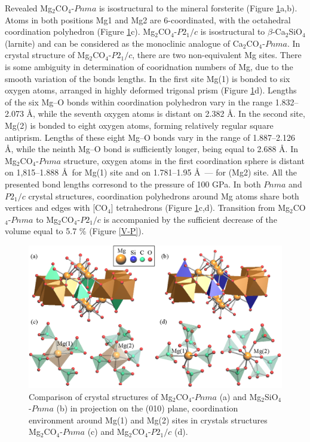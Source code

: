 \documentclass[a4paperm]{article}
\begin{document}
Revealed Mg$_2$CO$_4$-$Pnma$ is isostructural to the mineral forsterite (Figure \ref{str}a,b).
Atoms in both positions Mg1 and Mg2 are 6-coordinated, with the octahedral coordination polyhedron (Figure \ref{str}c). 
Mg$_2$CO$_4$-$P2_1/c$ is isostructural to $\beta$-Ca$_2$SiO$_4$ (larnite) and can be considered as the monoclinic analogue of Ca$_2$CO$_4$-$Pnma$.
In crystal structure of Mg$_2$CO$_4$-$P2_1/c$, there are two non-equivalent Mg sites.
There is some ambiguity in determination of cooridnation numbers of Mg, due to the smooth variation of the bonds lengths.
In the first site Mg(1) is bonded to six oxygen atoms, arranged in highly deformed trigonal prism  (Figure \ref{str}d).
Lengths of the six Mg--O bonds within coordination polyhedron vary in the range 1.832--2.073 \AA, while the seventh oxygen atoms is distant on 2.382 \AA.
In the second site, Mg(2) is bonded to eight oxygen atoms, forming relatively regular square antiprism.
Lengths of these eight Mg--O bonds vary in the range of 1.887--2.126 \AA, while the neinth Mg--O bond is sufficiently longer, being equal to 2.688 \AA.
In Mg$_2$CO$_4$-$Pnma$ structure, oxygen atoms in the first coordination sphere is distant on 1,815--1.888 \AA\ for Mg(1) site and on 1.781--1.95 \AA\ --- for (Mg2) site.
All the presented bond lengths corresond to the pressure of 100 GPa.
In both $Pnma$ and $P2_1/c$ crystal structures, coordination polyhedrons around Mg atoms share both vertices and edges with [CO$_4$] tetrahedrons (Figure \ref{str}c,d).
Transition from Mg$_2$CO$_4$-$Pnma$ to Mg$_2$CO$_4$-$P2_1/c$ is accompanied by the sufficient decrease of the volume equal to 5.7 \% (Figure \ref{V-P}).

\begin{figure}[H]
	\includegraphics[width=\textwidth]{mg2co4_str} \centering
	\caption{Comparison of crystal structures of Mg$_2$CO$_4$-$Pnma$ (a) and Mg$_2$SiO$_4$-$Pnma$ (b) in projection on the (010) plane, coordination environment around Mg(1) and Mg(2) sites in crystals structures Mg$_2$CO$_4$-$Pnma$ (c) and Mg$_2$CO$_4$-$P2_1/c$ (d).} 	\label{str}
\end{figure}
\end{document}

